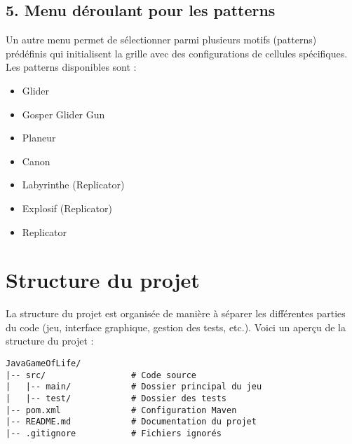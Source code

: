 \documentclass[a4paper,12pt]{article}
\begin{document}
\subsection*{5. Menu déroulant pour les patterns}
Un autre menu permet de sélectionner parmi plusieurs motifs (patterns) prédéfinis qui initialisent la grille avec des configurations de cellules spécifiques. Les patterns disponibles sont :
\begin{itemize}
    \item Glider
    \item Gosper Glider Gun
    \item Planeur
    \item Canon
    \item Labyrinthe (Replicator)
    \item Explosif (Replicator)
    \item Replicator
\end{itemize}

\section*{Structure du projet}
La structure du projet est organisée de manière à séparer les différentes parties du code (jeu, interface graphique, gestion des tests, etc.). Voici un aperçu de la structure du projet :

\begin{verbatim}
JavaGameOfLife/
|-- src/                 # Code source
|   |-- main/            # Dossier principal du jeu
|   |-- test/            # Dossier des tests
|-- pom.xml              # Configuration Maven
|-- README.md            # Documentation du projet
|-- .gitignore           # Fichiers ignorés
\end{verbatim}
\end{document}
